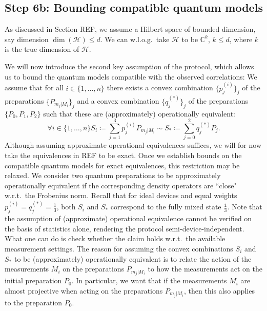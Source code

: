 \subsection{Step 6b: Bounding compatible quantum models}
As discussed in Section REF, we assume a Hilbert space of bounded dimension, say dimension $\operatorname{dim}(\mathcal{H})\leq d$. We can w.l.o.g.\ take $\mathcal{H}$ to be $\mathbb{C}^k$, $k\leq d$, where $k$ is the true dimension of $\mathcal{H}$.

We will now introduce the second key assumption of the protocol, which allows us to bound the quantum models compatible with the observed correlations: We assume that for all $i\in\{1,\dots,n\}$ there exists a convex combination $\{p_j^{(i)}\}_j$ of the preparations $\{P_{m_j\vert M_i}\}_j$ and a convex combination $\{q_j^{(*)}\}_j$ of the preparations $\{P_0,P_1,P_2\}$ such that these are (approximately) operationally equivalent:
\begin{equation}
\forall i\in\{1,\dots,n\} S_i \coloneqq \sum_{j=1}^3 p_j^{(i)}P_{m_j\vert M_i} \sim S_* \coloneqq \sum_{j=0}^2 q_j^{(*)}P_j.
\end{equation}
Although assuming approximate operational equivalences suffices, we will for now take the equivalences in REF to be exact. Once we establish bounds on the compatible quantum models for exact equivalences, this restriction may be relaxed. We consider two quantum preparations to be approximately operationally equivalent if the corresponding density operators are ``close" w.r.t.\ the Frobenius norm. Recall that for ideal devices and equal weights $p_j^{(i)}=q_j^{(*)}=\frac{1}{3}$, both $S_i$ and $S_{*}$ correspond to the fully mixed state $\frac{\mathbb{1}}{3}$. Note that the assumption of (approximate) operational equivalence cannot be verified on the basis of statistics alone, rendering the protocol semi-device-independent. What one can do is check whether the claim holds w.r.t.\ the available measurement settings. The reason for assuming the convex combinations $S_i$ and $S_{*}$ to be (approximately) operationally equivalent is to relate the action of the measurements $M_i$ on the preparations $P_{m_j\vert M_i}$ to how the measurements act on the initial preparation $P_0$. In particular, we want that if the measurements $M_i$ are almost projective when acting on the preparations $P_{m_j\vert M_i}$, then this also applies to the preparation $P_0$.

